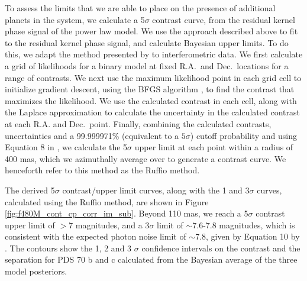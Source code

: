 \documentclass[11pt,twocolumn,twocolappendix]{aastex631}
\begin{document}
{To assess the limits that we are able to place on the presence of additional planets in the system, we calculate a 5$\sigma$ contrast curve, from the residual {kernel} phase signal of the power law model. {We use the approach described above to fit to the residual {kernel phase} %
signal, and calculate %
Bayesian upper limits. To do this, we adapt the method presented by \cite{2018AJ....156..196R} to interferometric data}. We first calculate a grid of likelihoods for a binary model at fixed R.A.\ and Dec.\ locations for a range of contrasts. We next use the maximum likelihood point in each grid cell to initialize gradient descent, using the BFGS algorithm \citep{10.1093/imamat/6.1.76,10.1093/comjnl/13.3.317,35d0019d-775a-3628-b0b4-67be112e346b,e3177091-3094-3792-9d61-0ab445735ddb}, to find the contrast that maximizes the likelihood. We use the calculated contrast in each cell, along with the Laplace approximation to calculate the uncertainty in the calculated contrast at each R.A. and Dec.\ point. Finally, {combining the calculated contrasts, uncertainties and a 99.999971\% (equivalent to a $5\sigma$) cutoff probability and using} Equation 8 in \cite{2018AJ....156..196R}, {we} calculate the {5$\sigma$} upper limit at each point {within a radius of 400 mas, which we} azimuthally average over to generate a contrast curve. We henceforth refer to this method as the Ruffio method. }

The derived 5$\sigma$ contrast/upper limit curves{, along with the 1 and 3$\sigma$ curves, %
calculated using the {%
Ruffio method}, are shown in Figure \ref{fig:f480M_cont_cp_corr_im_sub}. Beyond 110 mas, we reach a 5$\sigma$ contrast upper limit of $>$7 magnitudes, and a 3$\sigma$ limit of $\sim$7.6-7.8 magnitudes, which is consistent with the expected photon noise limit of $\sim$7.8, given by Equation 10 by \cite{2023PASP..135a5003S}.} The contours show the 1, 2 and 3 $\sigma$ confidence intervals on the contrast and the separation for PDS 70 b and c calculated from the {Bayesian average of the three model posteriors}.%
\end{document}
